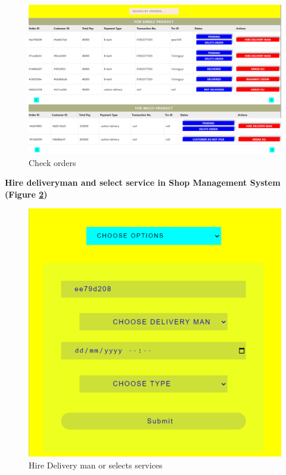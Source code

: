 \begin{figure}[ht]
    \centering  
    \includegraphics[width=\textwidth, height=0.3\textheight, keepaspectratio]{designs/check -order - staffs.png}    
    \caption{Check orders}
    \label{fig:fig 6.2.20}
\end{figure}

\newpage

\textbf{Hire deliveryman and select service in Shop Management System (Figure \ref{fig:fig 6.2.21})}
\vspace{2cm}
\begin{figure}[ht]
    \centering  
    \includegraphics[width=\textwidth, height=0.9\textheight, keepaspectratio]{designs/hire deliveryman and select service for existing order staffs.png}    
    \caption{Hire Delivery man or selects services}
    \label{fig:fig 6.2.21}
\end{figure}

